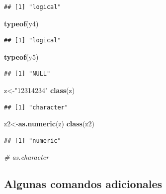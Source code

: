 \documentclass[
]{book}
\newenvironment{Shaded}{\begin{snugshade}}{\end{snugshade}}
\newcommand{\CommentTok}[1]{\textcolor[rgb]{0.56,0.35,0.01}{\textit{#1}}}
\newcommand{\KeywordTok}[1]{\textcolor[rgb]{0.13,0.29,0.53}{\textbf{#1}}}
\newcommand{\NormalTok}[1]{#1}
\newcommand{\StringTok}[1]{\textcolor[rgb]{0.31,0.60,0.02}{#1}}
\begin{document}
\begin{verbatim}
## [1] "logical"
\end{verbatim}

\begin{Shaded}
\begin{Highlighting}[]
\KeywordTok{typeof}\NormalTok{(y4)}
\end{Highlighting}
\end{Shaded}

\begin{verbatim}
## [1] "logical"
\end{verbatim}

\begin{Shaded}
\begin{Highlighting}[]
\KeywordTok{typeof}\NormalTok{(y5)}
\end{Highlighting}
\end{Shaded}

\begin{verbatim}
## [1] "NULL"
\end{verbatim}

\begin{Shaded}
\begin{Highlighting}[]
\NormalTok{z<-}\StringTok{"12314234"}
\KeywordTok{class}\NormalTok{(z)}
\end{Highlighting}
\end{Shaded}

\begin{verbatim}
## [1] "character"
\end{verbatim}

\begin{Shaded}
\begin{Highlighting}[]
\NormalTok{z2<-}\KeywordTok{as.numeric}\NormalTok{(z)}
\KeywordTok{class}\NormalTok{(z2)}
\end{Highlighting}
\end{Shaded}

\begin{verbatim}
## [1] "numeric"
\end{verbatim}

\begin{Shaded}
\begin{Highlighting}[]
\CommentTok{# as.character}
\end{Highlighting}
\end{Shaded}

\hypertarget{algunas-comandos-adicionales}{%
\subsection{Algunas comandos adicionales}\label{algunas-comandos-adicionales}}
\end{document}
